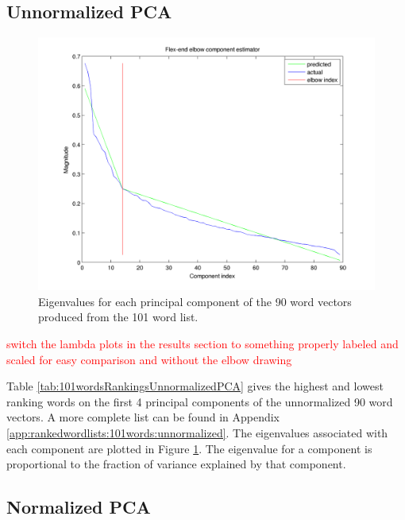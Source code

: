 \documentclass[10pt,letterpaper]{book}
\newcommand{\todo}[1]{\textcolor{red}{#1}}
\begin{document}
\subsection{Unnormalized PCA}



\begin{figure}[!htbp]
    \includegraphics[width=0.9\linewidth]{100words-adj-800dim-lowercase_wmt_model-original-flex_end_elbow}
    \caption{Eigenvalues for each principal component of the 90 word vectors
    produced from the 101 word list.}
    \label{fig:101wordsunnormalizedpcaeigenvalues}
\end{figure}

\todo{switch the lambda plots in the results section to something properly labeled and scaled for easy comparison and without the elbow drawing}


Table \ref{tab:101wordsRankingsUnnormalizedPCA} gives the highest and lowest
ranking words on the first 4 principal components of the unnormalized 90 word 
vectors. A more complete list can be found in Appendix 
\ref{app:rankedwordlists:101words:unnormalized}. The eigenvalues associated 
with each component are plotted in Figure 
\ref{fig:101wordsunnormalizedpcaeigenvalues}. The eigenvalue for a component is
proportional to the fraction of variance explained by that component.


\subsection{Normalized PCA}


\end{document}
